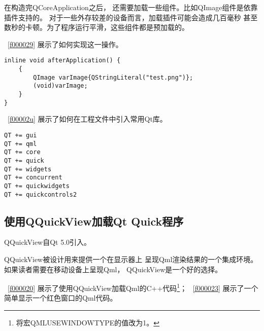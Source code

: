 在构造完QCoreApplication之后，
还需要加载一些组件。比如QImage组件是依靠插件支持的。
对于一些外存较差的设备而言，加载插件可能会造成几百毫秒
甚至数秒的卡顿。为了程序运行平滑，这些组件都是预加载的。

\lstlistingname\ \ref{f000029}
展示了如何实现这一操作。

\FloatBarrier
\begin{lstlisting}[label=f000029,
caption=GoodLuck,
title=\lstlistingname\ \thelstlisting
,firstnumber=54]
inline void afterApplication() {
    {
        QImage varImage{QStringLiteral("test.png")};
        (void)varImage;
    }
}
\end{lstlisting}          %

\lstlistingname\ \ref{f00002u}
展示了如何在工程文件中引入常用Qt库。

\FloatBarrier
\begin{lstlisting}[label=f00002u,
caption=GoodLuck,
title=\lstlistingname\ \thelstlisting
]
QT += gui
QT += qml
QT += core
QT += quick
QT += widgets
QT += concurrent
QT += quickwidgets
QT += quickcontrols2
\end{lstlisting}          %

\FloatBarrier
\subsection{
使用QQuickView加载Qt Quick程序
}\label{ss001010}


QQuickView自Qt 5.0引入。

QQuickView被设计用来提供一个在显示器上
呈现Qml渲染结果的一个集成环境。
如果读者需要在移动设备上呈现Qml，
QQuickView是一个好的选择。

\lstlistingname\ \ref{f000020}
展示了使用QQuickView加载Qml的C{\sourcefonttwo{}+}{\sourcefonttwo{}+}代码\footnote{
将宏QML\underline{\hspace{0.5em}}USE\underline{\hspace{0.5em}}WINDOW\underline{\hspace{0.5em}}TYPE的值改为1。
}；
\lstlistingname\ \ref{f000023}
展示了一个简单显示一个红色窗口的Qml代码。

